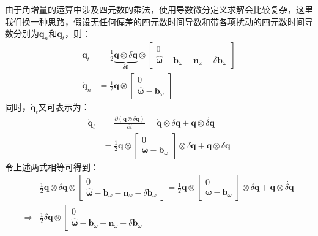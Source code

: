 \begin{enumerate}
	由于角增量的运算中涉及四元数的乘法，使用导数微分定义求解会比较复杂，这里我们换一种思路，假设无任何偏差的四元数时间导数和带各项扰动的四元数时间导数分别为$\dot{\bm{q}}_n$和$\dot{\bm{q}}_t$，则：
	\begin{equation}
	\begin{aligned}
	\dot{\bm{q}}_t&=\frac{1}{2}\underbrace{\bm{q}\otimes\delta\bm{q}}_{\delta\bm{\theta}}\otimes\left[\begin{array}{c}
	0\\\hat{\bm{\omega}}-\bm{b}_\omega-\bm{n}_\omega-\delta\bm{b}_\omega	
	\end{array}\right]\\
	\dot{\bm{q}}_n&=\frac{1}{2}\bm{q}\otimes\left[\begin{array}{c}
	0\\\hat{\bm{\omega}}-\bm{b}_\omega
	\end{array}\right]	
	\end{aligned}
	\end{equation}
	同时，$\dot{\bm{q}}_t$又可表示为：
	\begin{equation}
	\begin{aligned}
	\dot{\bm{q}}_t&=\frac{\partial\left(\bm{q}\otimes\delta\bm{q}\right)}{\partial t}=\dot{\bm{q}}\otimes\delta\bm{q}+\bm{q}\otimes\dot{\delta\bm{q}}\\
	&=\frac{1}{2}\bm{q}\otimes\left[\begin{array}{c}
	0\\\bm{\omega}-\bm{b}_\omega
	\end{array}\right]\otimes\delta\bm{q}+\bm{q}\otimes\dot{\delta\bm{q}}
	\end{aligned}
	\end{equation}
	令上述两式相等可得到：
	\begin{equation}
	\begin{aligned}
	&\frac{1}{2}\bm{q}\otimes\delta\bm{q}\otimes\left[\begin{array}{c}
	0\\\hat{\bm{\omega}}-\bm{b}_\omega-\bm{n}_\omega-\delta\bm{b}_\omega	
	\end{array}\right]=\frac{1}{2}\bm{q}\otimes\left[\begin{array}{c}
	0\\\bm{\omega}-\bm{b}_\omega
	\end{array}\right]\otimes\delta\bm{q}+\bm{q}\otimes\dot{\delta\bm{q}}\\
	\Rightarrow&\frac{1}{2}\delta\bm{q}\otimes\left[\begin{array}{c}
	0\\\hat{\bm{\omega}}-\bm{b}_\omega-\bm{n}_\omega-\delta\bm{b}_\omega	

\end{array}
\end{aligned}
\end{equation}
\end{enumerate}
